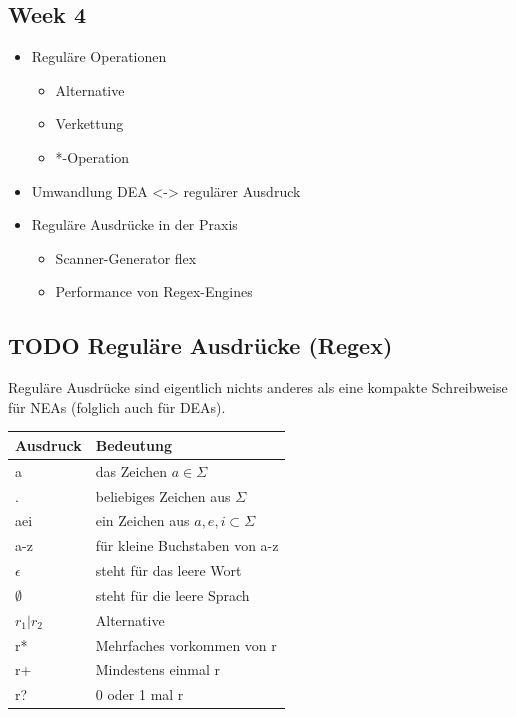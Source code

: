 \documentclass[11pt,twoside,landscape]{article}
\begin{document}
\begin{multicols}{3}
\section{Week 4}
\label{sec:orgefccc75}
\begin{itemize}
\item Reguläre Operationen
\begin{itemize}
\item Alternative
\item Verkettung
\item *-Operation
\end{itemize}
\item Umwandlung DEA <-> regulärer Ausdruck
\item Reguläre Ausdrücke in der Praxis
\begin{itemize}
\item Scanner-Generator flex
\item Performance von Regex-Engines
\end{itemize}
\end{itemize}


\subsection{{\bfseries\sffamily TODO} Reguläre Ausdrücke (Regex)}
\label{sec:org43f51f1}
Reguläre Ausdrücke sind eigentlich nichts anderes als eine kompakte Schreibweise für NEAs (folglich auch für DEAs).
\begin{center}
\begin{tabular}{ll}
Ausdruck & Bedeutung\\
\hline
a & das Zeichen \(a \in \Sigma\)\\
. & beliebiges Zeichen aus \(\Sigma\)\\
aei & ein Zeichen aus \({a, e, i} \subset \Sigma\)\\
a-z & für kleine Buchstaben von a-z\\
\(\epsilon\) & steht für das leere Wort\\
\(\emptyset\) & steht für die leere Sprach\\
\(r_{1}\vert r_{2}\) & Alternative\\
r* & Mehrfaches vorkommen von r\\
r+ & Mindestens einmal r\\
r? & 0 oder 1 mal r\\
\end{tabular}
\end{center}



\end{multicols}
\end{document}
